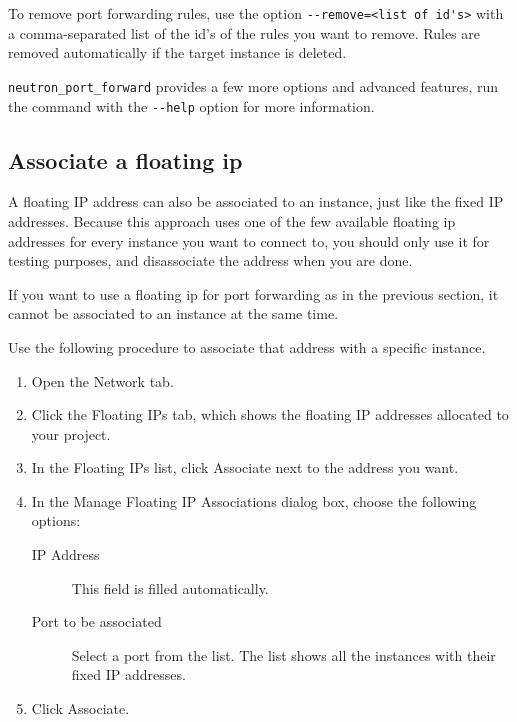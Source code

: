 \begin{prompt}
\end{prompt}

To remove port forwarding rules, use the option
\lstinline{--remove=<list of id's>} with a comma-separated list of the
id's of the rules you want to remove.  Rules are removed automatically
if the target instance is deleted.

\lstinline{neutron_port_forward} provides a few more options and
advanced features, run the command with the \lstinline{--help} option
for more information.

\subsection*{Associate a floating ip}
A floating IP address can also be associated to an instance, just like
the fixed IP addresses.  Because this approach uses one of the few
available floating ip addresses for every instance you want to connect
to, you should only use it for testing purposes, and disassociate the
address when you are done.

 If you want to use a floating ip for port forwarding as
in the previous section, it cannot be associated to an instance at the
same time.

Use the following procedure to associate that address with a specific
instance.

\begin{enumerate}
\item Open the Network tab.
\item Click the Floating IPs tab, which shows the floating IP
  addresses allocated to your project.
\item In the Floating IPs list, click Associate next to the address you want.
\item In the Manage Floating IP Associations dialog box, choose the
  following options:

  \begin{description}
  \item[IP Address] This field is filled automatically.
  \item[Port to be associated] Select a port from the list.  The list shows all the instances with their fixed IP addresses.
  \end{description}
\item Click Associate.
\end{enumerate}

